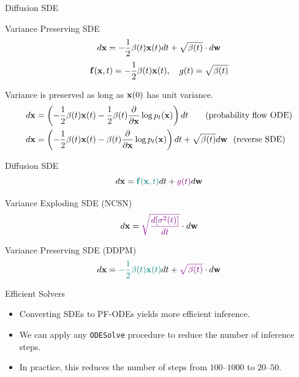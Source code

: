 \documentclass{beamer}
\begin{document}
\begin{frame}{Diffusion SDE}
	\begin{block}{Variance Preserving SDE}
		\vspace{-0.3cm}
		\[
			d \mathbf{x} = - \frac{1}{2} \beta(t) \mathbf{x}(t) dt + \sqrt{\beta(t)} \cdot d \mathbf{w}
		\]
		\[
			\mathbf{f}(\mathbf{x}, t) = - \frac{1}{2} \beta(t) \mathbf{x}(t) , \quad g(t) = \sqrt{\beta(t)} 
		\]
	\end{block}
	Variance is preserved as long as $\mathbf{x}(0)$ has unit variance.
    \eqpause
	\begin{align*}
		d\mathbf{x} &= \left(- \frac{1}{2} \beta(t) \mathbf{x}(t) - \frac{1}{2} \beta(t) \frac{\partial}{\partial \mathbf{x}} \log p_t(\mathbf{x}) \right) dt \quad\quad \text{(probability flow ODE)} \\
		d\mathbf{x} &= \left(- \frac{1}{2} \beta(t) \mathbf{x}(t) - \beta(t) \frac{\partial}{\partial \mathbf{x}} \log p_t(\mathbf{x})\right) dt + \sqrt{\beta(t)} d \mathbf{w}\ \ \text{(reverse SDE)}
	\end{align*}
\end{frame}
\begin{frame}{Diffusion SDE}
	\vspace{-0.3cm}
	\[
		d\mathbf{x} = {\color{teal}\mathbf{f}(\mathbf{x}, t)} dt + {\color{violet}g(t)} d \mathbf{w}
	\]
    \eqpause
	\vspace{-0.5cm}
	\begin{block}{Variance Exploding SDE (NCSN)}
		\vspace{-0.3cm}
		\[
			d \mathbf{x} = {\color{violet}\sqrt{\frac{ d [\sigma^2(t)]}{dt}}} \cdot d \mathbf{w}
		\]
		\vspace{-0.5cm}
	\end{block}
	\begin{block}{Variance Preserving SDE (DDPM)}
		\vspace{-0.3cm}
		\[
			d \mathbf{x} = {\color{teal}- \frac{1}{2} \beta(t) \mathbf{x}(t)} dt + {\color{violet}\sqrt{\beta(t)}} \cdot d \mathbf{w}
		\]
		\vspace{-0.5cm}
	\end{block}
    \eqpause
	\begin{block}{Efficient Solvers}
		\begin{itemize}
		\item Converting SDEs to PF-ODEs yields more efficient inference.
		\item We can apply any \texttt{ODESolve} procedure to reduce the number of inference steps.
		\item In practice, this reduces the number of steps from $100$--$1000$ to $20$--$50$.
		\end{itemize}
	\end{block}
\end{frame}
\end{document}
